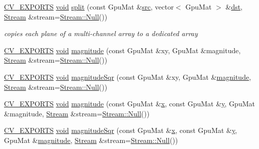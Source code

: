 \begin{DoxyCompactItemize}
\hyperlink{core_2types__c_8h_a1bf9f0e121b54272da02379cfccd0a2b}{C\-V\-\_\-\-E\-X\-P\-O\-R\-T\-S} \hyperlink{legacy_8hpp_a8bb47f092d473522721002c86c13b94e}{void} \hyperlink{namespacecv_1_1gpu_a73f7e9a012350d3d95377296b2cb1504}{split} (const Gpu\-Mat \&\hyperlink{legacy_8hpp_a371cd109b74033bc4366f584edd3dacc}{src}, vector$<$ Gpu\-Mat $>$ \&\hyperlink{photo__c_8h_aed13e2a25279b24dc954073233fef7a5}{dst}, \hyperlink{classcv_1_1gpu_1_1Stream}{Stream} \&stream=\hyperlink{classcv_1_1gpu_1_1Stream_af96c23564834f88333dcb8997df553f1}{Stream\-::\-Null}())
\begin{DoxyCompactList}\small\item\em copies each plane of a multi-\/channel array to a dedicated array \end{DoxyCompactList}\item 
\hyperlink{core_2types__c_8h_a1bf9f0e121b54272da02379cfccd0a2b}{C\-V\-\_\-\-E\-X\-P\-O\-R\-T\-S} \hyperlink{legacy_8hpp_a8bb47f092d473522721002c86c13b94e}{void} \hyperlink{namespacecv_1_1gpu_a635c000781dd2093cb63a5d94ae5a528}{magnitude} (const Gpu\-Mat \&xy, Gpu\-Mat \&magnitude, \hyperlink{classcv_1_1gpu_1_1Stream}{Stream} \&stream=\hyperlink{classcv_1_1gpu_1_1Stream_af96c23564834f88333dcb8997df553f1}{Stream\-::\-Null}())
\item 
\hyperlink{core_2types__c_8h_a1bf9f0e121b54272da02379cfccd0a2b}{C\-V\-\_\-\-E\-X\-P\-O\-R\-T\-S} \hyperlink{legacy_8hpp_a8bb47f092d473522721002c86c13b94e}{void} \hyperlink{namespacecv_1_1gpu_a5e9109a6a14b77eed40bc0b196e234d4}{magnitude\-Sqr} (const Gpu\-Mat \&xy, Gpu\-Mat \&\hyperlink{namespacecv_1_1gpu_a635c000781dd2093cb63a5d94ae5a528}{magnitude}, \hyperlink{classcv_1_1gpu_1_1Stream}{Stream} \&stream=\hyperlink{classcv_1_1gpu_1_1Stream_af96c23564834f88333dcb8997df553f1}{Stream\-::\-Null}())
\item 
\hyperlink{core_2types__c_8h_a1bf9f0e121b54272da02379cfccd0a2b}{C\-V\-\_\-\-E\-X\-P\-O\-R\-T\-S} \hyperlink{legacy_8hpp_a8bb47f092d473522721002c86c13b94e}{void} \hyperlink{namespacecv_1_1gpu_a4330ee14ddeede60e9a830a9c7b66575}{magnitude} (const Gpu\-Mat \&\hyperlink{highgui__c_8h_a6150e0515f7202e2fb518f7206ed97dc}{x}, const Gpu\-Mat \&\hyperlink{highgui__c_8h_af1202c02b14870c18fb3a1da73e9e7c7}{y}, Gpu\-Mat \&magnitude, \hyperlink{classcv_1_1gpu_1_1Stream}{Stream} \&stream=\hyperlink{classcv_1_1gpu_1_1Stream_af96c23564834f88333dcb8997df553f1}{Stream\-::\-Null}())
\item 
\hyperlink{core_2types__c_8h_a1bf9f0e121b54272da02379cfccd0a2b}{C\-V\-\_\-\-E\-X\-P\-O\-R\-T\-S} \hyperlink{legacy_8hpp_a8bb47f092d473522721002c86c13b94e}{void} \hyperlink{namespacecv_1_1gpu_a0f96749747aa8fc5f98c2f774cad237f}{magnitude\-Sqr} (const Gpu\-Mat \&\hyperlink{highgui__c_8h_a6150e0515f7202e2fb518f7206ed97dc}{x}, const Gpu\-Mat \&\hyperlink{highgui__c_8h_af1202c02b14870c18fb3a1da73e9e7c7}{y}, Gpu\-Mat \&\hyperlink{namespacecv_1_1gpu_a635c000781dd2093cb63a5d94ae5a528}{magnitude}, \hyperlink{classcv_1_1gpu_1_1Stream}{Stream} \&stream=\hyperlink{classcv_1_1gpu_1_1Stream_af96c23564834f88333dcb8997df553f1}{Stream\-::\-Null}())

\end{DoxyCompactItemize}
